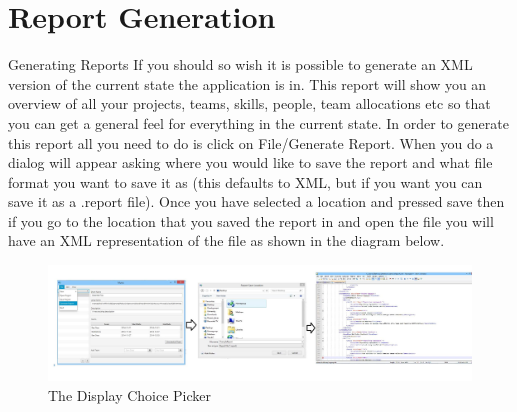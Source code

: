 \section{Report Generation}

Generating Reports
\newline
If you should so wish it is possible to generate an XML version of the current state the application is in. This report will show you an overview of all your projects, teams, skills, people, team allocations etc so that you can get a general feel for everything in the current state.
\newline\newline
In order to generate this report all you need to do is click on File/Generate Report. When you do a dialog will appear asking where you would like to save the report and what file format you want to save it as (this defaults to XML, but if you want you can save it as a .report file). Once you have selected a location and pressed save then if you go to the location that you saved the report in and open the file you will have an XML representation of the file as shown in the diagram below.

\begin{figure}[H]
\centering
\includegraphics[width=\textwidth]{images/screenshots/report1.PNG}
\caption{The Display Choice Picker}
\label{fig:new_project}
\end{figure}